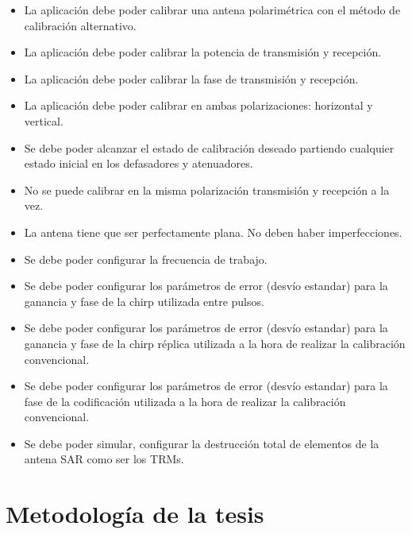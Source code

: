 \documentclass[a4paper,10pt]{article}
\begin{document}
\begin{itemize}
    \item La aplicación debe poder calibrar una antena polarimétrica con el
método de calibración alternativo.
    
    \item La aplicación debe poder calibrar la potencia de transmisión y 
recepción.
    
    \item La aplicación debe poder calibrar la fase de transmisión y 
recepción.
    
    \item La aplicación debe poder calibrar en ambas polarizaciones: horizontal
y vertical.
    
    \item Se debe poder alcanzar el estado de calibración deseado partiendo 
cualquier estado inicial en los defasadores y atenuadores.
    
    \item No se puede calibrar en la misma polarización transmisión y recepción 
a la vez.
    
    \item La antena tiene que ser perfectamente plana. No deben haber 
imperfecciones.
           
    \item Se debe poder configurar la frecuencia de trabajo.

    \item Se debe poder configurar los parámetros de error (desvío estandar) 
para la ganancia y fase de la chirp utilizada entre pulsos.

    \item Se debe poder configurar los parámetros de error (desvío estandar) 
para la ganancia y fase de la chirp réplica utilizada a la hora de realizar la 
calibración convencional.
    
    \item Se debe poder configurar los parámetros de error (desvío estandar) 
para la fase de la codificación utilizada a la hora de realizar la calibración
convencional.

    \item Se debe poder simular, configurar la destrucción total de elementos de
la antena SAR como ser los TRMs.
\end{itemize}


\section{Metodología de la tesis}
\end{document}
